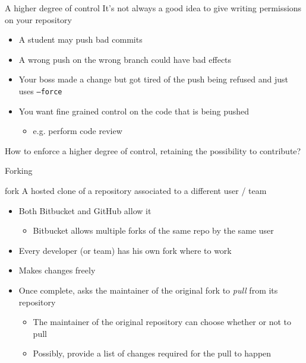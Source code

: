 \documentclass[presentation]{beamer}
\begin{document}
\begin{frame}{A higher degree of control}
    It's not always a good idea to give writing permissions on your repository
    \begin{itemize}
        \item A student may push bad commits
        \item A wrong push on the wrong branch could have bad effects
        \item Your boss made a change but got tired of the push being refused and just uses \texttt{--force}
        \item You want fine grained control on the code that is being pushed
        \begin{itemize}
            \item e.g. perform code review
        \end{itemize}
    \end{itemize}
    How to enforce a higher degree of control, retaining the possibility to contribute?
\end{frame}

\begin{frame}{Forking}
    \begin{block}{fork}
        A hosted clone of a repository associated to a different user / team
    \end{block}
    \begin{itemize}
        \item Both Bitbucket and GitHub allow it
        \begin{itemize}
            \item Bitbucket allows multiple forks of the same repo by the same user
        \end{itemize}
        \item Every developer (or team) has his own fork where to work
        \item Makes changes freely
        \item Once complete, asks the maintainer of the original fork to \textit{pull} from its repository
        \begin{itemize}
            \item The maintainer of the original repository can choose whether or not to pull
            \item Possibly, provide a list of changes required for the pull to happen
        \end{itemize}
    \end{itemize}
\end{frame}
\end{document}
